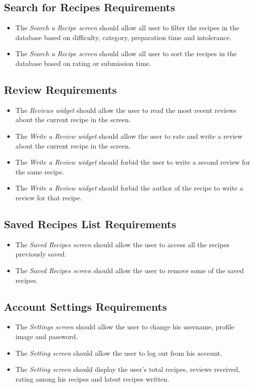 	\subsection{Search for Recipes Requirements}
		\begin{itemize}
			\item The \textit{Search a Recipe screen} should allow all user to filter the recipes in the database based on difficulty, category, preparation time and intolerance.
			\item The \textit{Search a Recipe screen} should allow all user to sort the recipes in the database based on rating or submission time.
		\end{itemize}

	\subsection{Review Requirements}
		\begin{itemize}
			\item The \textit{Reviews widget} should allow the user to read the most recent reviews about the current recipe in the screen.
			\item The \textit{Write a Review widget} should allow the user to rate and write a review about the current recipe in the screen.
			\item The \textit{Write a Review widget} should forbid the user to write a second review for the same recipe.
			\item The \textit{Write a Review widget} should forbid the author of the recipe to write a review for that recipe.
		\end{itemize}

	\subsection{Saved Recipes List Requirements}
		\begin{itemize}
			\item The \textit{Saved Recipes screen} should allow the user to access all the recipes previously saved.
			\item The \textit{Saved Recipes screen} should allow the user to remove some of the saved recipes.
		\end{itemize}

	\subsection{Account Settings Requirements}
		\begin{itemize}
			\item The \textit{Settings screen} should allow the user to change his username, profile image and password.
			\item The \textit{Setting screen} should allow the user to log out from his account.
			\item The \textit{Setting screen} should display the user's total recipes, reviews received, rating among his recipes and latest recipes written.
		\end{itemize}


